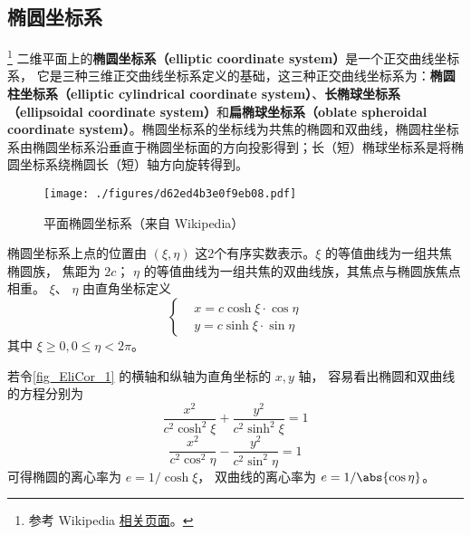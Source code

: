 
\begin{issues}
\end{issues}


\subsection{椭圆坐标系}
\footnote{参考 Wikipedia \href{https://en.wikipedia.org/wiki/Elliptic_coordinate_system}{相关页面}。}
二维平面上的\textbf{椭圆坐标系（elliptic coordinate system）}是一个正交曲线坐标系， 它是三种三维正交曲线坐标系定义的基础，这三种正交曲线坐标系为：\textbf{椭圆柱坐标系（elliptic cylindrical coordinate system）}、\textbf{长椭球坐标系（ellipsoidal coordinate system）}和\textbf{扁椭球坐标系（oblate spheroidal coordinate system）}。椭圆坐标系的坐标线为共焦的椭圆和双曲线，椭圆柱坐标系由椭圆坐标系沿垂直于椭圆坐标面的方向投影得到；长（短）椭球坐标系是将椭圆坐标系绕椭圆长（短）轴方向旋转得到。

\begin{figure}[ht]
\centering
\texttt{[image: ./figures/d62ed4b3e0f9eb08.pdf]}
\caption{平面椭圆坐标系（来自 Wikipedia）} \label{fig_EliCor_1}
\end{figure}

椭圆坐标系上点的位置由 $(\xi,\eta)$ 这2个有序实数表示。$\xi$ 的等值曲线为一组共焦椭圆族， 焦距为 $2c$； $\eta$ 的等值曲线为一组共焦的双曲线族，其焦点与椭圆族焦点相重。 $\xi$、 $\eta$ 由直角坐标定义
\begin{equation}\label{eq_EliCor_3}
\left\{\begin{aligned}
&x=c\cosh\xi\cdot\cos\eta\\
&y=c\sinh\xi\cdot\sin\eta
\end{aligned}\right.
\end{equation}
其中 $\xi\geq0,0\leq\eta<2\pi$。

若令\autoref{fig_EliCor_1} 的横轴和纵轴为直角坐标的 $x, y$ 轴， 容易看出椭圆和双曲线的方程分别为
\begin{equation}\label{eq_EliCor_4}
\frac{x^2}{c^2\cosh^2\xi}+\frac{y^2}{c^2\sinh^2\xi}=1
\end{equation}
\begin{equation}\label{eq_EliCor_5}
\frac{x^2}{c^2\cos^2\eta}-\frac{y^2}{c^2\sin^2\eta}=1
\end{equation}
可得椭圆的离心率为 $e = 1/\cosh \xi$， 双曲线的离心率为 $e = 1/\abs{\cos \eta}$。

